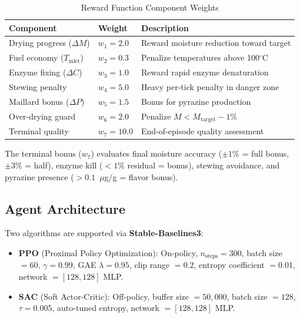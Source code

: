 ﻿\documentclass[12pt, a4paper]{report}
\begin{document}
\begin{table}[H]
\centering
\caption{Reward Function Component Weights}
\label{tab:reward_weights}
\begin{tabular}{@{}lll@{}}
\toprule
\textbf{Component} & \textbf{Weight} & \textbf{Description} \\
\midrule
Drying progress ($\Delta M$) & $w_1 = 2.0$ & Reward moisture reduction toward target \\
Fuel economy ($T_{\text{inlet}}$)   & $w_2 = 0.3$ & Penalize temperatures above 100$^\circ$C \\
Enzyme fixing ($\Delta C$)          & $w_3 = 1.0$ & Reward rapid enzyme denaturation \\
Stewing penalty                     & $w_4 = 5.0$ & Heavy per-tick penalty in danger zone \\
Maillard bonus ($\Delta P$)         & $w_5 = 1.5$ & Bonus for pyrazine production \\
Over-drying guard                   & $w_6 = 2.0$ & Penalize $M < M_{\text{target}} - 1\%$ \\
Terminal quality                    & $w_7 = 10.0$ & End-of-episode quality assessment \\
\bottomrule
\end{tabular}
\end{table}

\noindent The terminal bonus ($w_7$) evaluates final moisture accuracy ($\pm 1\%$ = full bonus, $\pm 3\%$ = half), enzyme kill ($< 1\%$ residual = bonus), stewing avoidance, and pyrazine presence ($> 0.1$~$\mu$g/g = flavor bonus).

\subsection{Agent Architecture}
Two algorithms are supported via \textbf{Stable-Baselines3}:
\begin{itemize}
    \item \textbf{PPO} (Proximal Policy Optimization): On-policy, $n_{\text{steps}} = 300$, batch size $= 60$, $\gamma = 0.99$, GAE $\lambda = 0.95$, clip range $= 0.2$, entropy coefficient $= 0.01$, network $= [128, 128]$ MLP.
    \item \textbf{SAC} (Soft Actor-Critic): Off-policy, buffer size $= 50{,}000$, batch size $= 128$, $\tau = 0.005$, auto-tuned entropy, network $= [128, 128]$ MLP.
\end{itemize}
\end{document}
